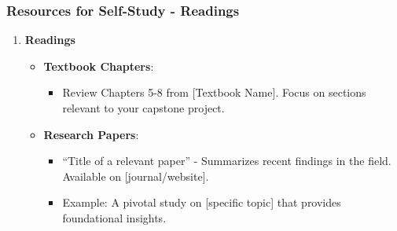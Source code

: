 \documentclass[aspectratio=169]{beamer}
\begin{document}
\begin{frame}[fragile]
    \frametitle{Resources for Self-Study - Readings}
    \begin{enumerate}
        \item \textbf{Readings}
        \begin{itemize}
            \item \textbf{Textbook Chapters}:
                \begin{itemize}
                    \item Review Chapters 5-8 from [Textbook Name]. Focus on sections relevant to your capstone project.
                \end{itemize}
            \item \textbf{Research Papers}:
                \begin{itemize}
                    \item “Title of a relevant paper” - Summarizes recent findings in the field. Available on [journal/website].
                    \item Example: A pivotal study on [specific topic] that provides foundational insights.
                \end{itemize}
        \end{itemize}
    \end{enumerate}
\end{frame}
\end{document}

